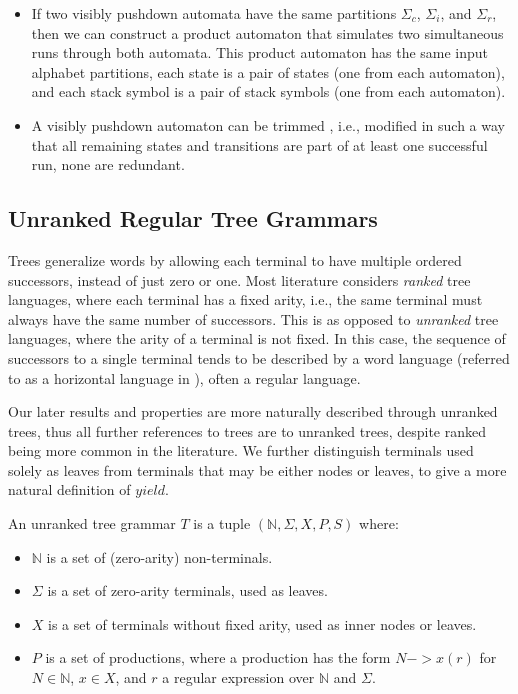 \documentclass[acmsmall,review,anonymous]{acmart}\settopmatter{printfolios=true,printccs=false,printacmref=false}
\newcommand{\NT}{\mathbb{N}} %
\newcommand{\T}{\Sigma} %
\newcommand{\yield}{\mathit{yield}} %
\begin{document}
\begin{itemize}
\item If two visibly pushdown automata have the same partitions $\Sigma_c$, $\Sigma_i$, and $\Sigma_r$, then we can construct a product automaton that simulates two simultaneous runs through both automata. This product automaton has the same input alphabet partitions, each state is a pair of states (one from each automaton), and each stack symbol is a pair of stack symbols (one from each automaton).
\item A visibly pushdown automaton can be trimmed \cite{caralpTrimmingVisiblyPushdown2013}, i.e., modified in such a way that all remaining states and transitions are part of at least one successful run, none are redundant.
\end{itemize}

\subsection{Unranked Regular Tree Grammars} \label{sec:preliminaries-trees}

Trees generalize words by allowing each terminal to have multiple ordered successors, instead of just zero or one. Most literature considers \emph{ranked} tree languages, where each terminal has a fixed arity, i.e., the same terminal must always have the same number of successors. This is as opposed to \emph{unranked} tree languages, where the arity of a terminal is not fixed. In this case, the sequence of successors to a single terminal tends to be described by a word language (referred to as a horizontal language in \cite{comonTreeAutomataTechniques2007}), often a regular language.

Our later results and properties are more naturally described through unranked trees, thus all further references to trees are to unranked trees, despite ranked being more common in the literature. We further distinguish terminals used solely as leaves from terminals that may be either nodes or leaves, to give a more natural definition of $\yield$.

An unranked tree grammar $T$ is a tuple $(\NT, \T, X, P, S)$ where:

\begin{itemize}
\item $\NT$ is a set of (zero-arity) non-terminals.
\item $\T$ is a set of zero-arity terminals, used as leaves.
\item $X$ is a set of terminals without fixed arity, used as inner nodes or leaves.
\item $P$ is a set of productions, where a production has the form $N -> x(r)$ for $N \in \NT$, $x \in X$, and $r$ a regular expression over $\NT$ and $\T$.
\end{itemize}
\end{document}
